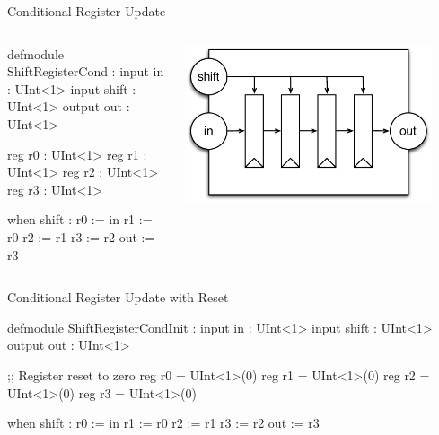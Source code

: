 \documentclass[xcolor=pdflatex,dvipsnames,table]{beamer}
\begin{document}
\begin{frame}[fragile]{Conditional Register Update}

\begin{columns}


\begin{stanza}
defmodule ShiftRegisterCond :
  input in : UInt<1>
  input shift : UInt<1>
  output out : UInt<1>

  reg r0 : UInt<1>
  reg r1 : UInt<1>
  reg r2 : UInt<1>
  reg r3 : UInt<1>

  when shift :
    r0 := in
    r1 := r0
    r2 := r1
    r3 := r2
  out := r3
\end{stanza}


\begin{center}
\includegraphics[width=0.9\textwidth]{figs/enable-shift-register.pdf}
\end{center}

\end{columns}

\end{frame}

\begin{frame}[fragile]{Conditional Register Update with Reset}

\begin{stanza}
defmodule ShiftRegisterCondInit :
  input in : UInt<1>
  input shift : UInt<1>
  output out : UInt<1>

  ;; Register reset to zero
  reg r0 = UInt<1>(0)
  reg r1 = UInt<1>(0)
  reg r2 = UInt<1>(0)
  reg r3 = UInt<1>(0)

  when shift :
    r0 := in
    r1 := r0
    r2 := r1
    r3 := r2
  out := r3
\end{stanza}

\end{frame}
\end{document}
